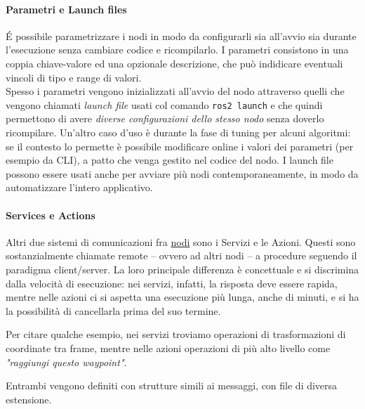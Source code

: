 \paragraph{Parametri e Launch files}
É possibile parametrizzare i nodi in modo da configurarli sia all'avvio sia durante l'esecuzione
senza cambiare codice e ricompilarlo. I parametri consistono in una coppia chiave-valore ed una
opzionale descrizione, che può indidicare eventuali vincoli di tipo e range di valori.\\
Spesso i parametri vengono inizializzati all'avvio del nodo attraverso quelli che vengono chiamati
\textit{launch file} usati col comando \verb|ros2 launch| e che quindi permettono di avere \textit{diverse
configurazioni dello stesso nodo} senza doverlo ricompilare. Un'altro caso d'uso è durante la fase di
tuning per alcuni algoritmi: se il contesto lo permette è possibile modificare online i valori dei
parametri (per esempio da CLI), a patto che venga gestito nel codice del nodo.
I launch file possono essere usati anche per avviare più nodi contemporaneamente, in modo da
automatizzare l'intero applicativo.

\paragraph{Services e Actions}
Altri due sistemi di comunicazioni fra \hyperref[ros:nodes]{nodi} sono i Servizi e le Azioni.
Questi sono sostanzialmente chiamate remote -- ovvero ad altri nodi -- a procedure seguendo il paradigma
client/server. La loro principale differenza è concettuale e si discrimina dalla velocità di esecuzione:
nei servizi, infatti, la risposta deve essere rapida, mentre nelle azioni ci si aspetta una esecuzione
più lunga, anche di minuti, e si ha la possibilità di cancellarla prima del suo termine.

Per citare qualche esempio, nei servizi troviamo operazioni di trasformazioni di coordinate tra frame, mentre
nelle azioni operazioni di più alto livello come \textit{"raggiungi questo waypoint"}.

Entrambi vengono definiti con strutture simili ai messaggi, con file di diversa estensione.

